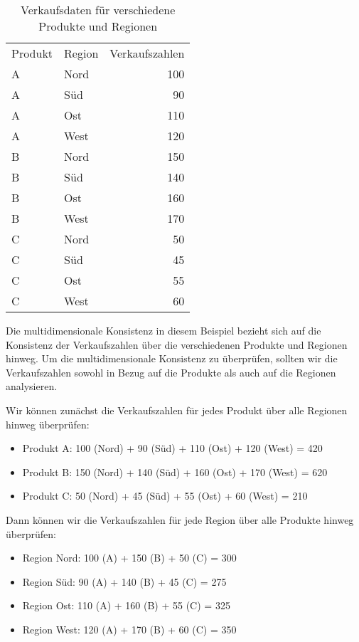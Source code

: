 \documentclass[../vs-script-first-v01.tex]{subfiles}
\begin{document}
\begin{table}[ht!]
\centering
\begin{tabular}{@{}llr@{}}
Produkt & Region & Verkaufszahlen \\ 
A       & Nord   & 100            \\
A       & Süd    & 90             \\
A       & Ost    & 110            \\
A       & West   & 120            \\
B       & Nord   & 150            \\
B       & Süd    & 140            \\
B       & Ost    & 160            \\
B       & West   & 170            \\
C       & Nord   & 50             \\
C       & Süd    & 45             \\
C       & Ost    & 55             \\
C       & West   & 60             \\ 
\end{tabular}
\caption{Verkaufsdaten für verschiedene Produkte und Regionen}
\end{table}
Die multidimensionale Konsistenz in diesem Beispiel bezieht sich auf die Konsistenz der Verkaufszahlen über die verschiedenen Produkte und Regionen hinweg. Um die multidimensionale Konsistenz zu überprüfen, sollten wir die Verkaufszahlen sowohl in Bezug auf die Produkte als auch auf die Regionen analysieren.

Wir können zunächst die Verkaufszahlen für jedes Produkt über alle Regionen hinweg überprüfen:
\begin{itemize}
    \item Produkt A: 100 (Nord) + 90 (Süd) + 110 (Ost) + 120 (West) = 420
    \item Produkt B: 150 (Nord) + 140 (Süd) + 160 (Ost) + 170 (West) = 620
    \item Produkt C: 50 (Nord) + 45 (Süd) + 55 (Ost) + 60 (West) = 210
\end{itemize}
Dann können wir die Verkaufszahlen für jede Region über alle Produkte hinweg überprüfen:
\begin{itemize}
    \item Region Nord: 100 (A) + 150 (B) + 50 (C) = 300
    \item Region Süd: 90 (A) + 140 (B) + 45 (C) = 275
    \item Region Ost: 110 (A) + 160 (B) + 55 (C) = 325
    \item Region West: 120 (A) + 170 (B) + 60 (C) = 350
\end{itemize}
\end{document}

